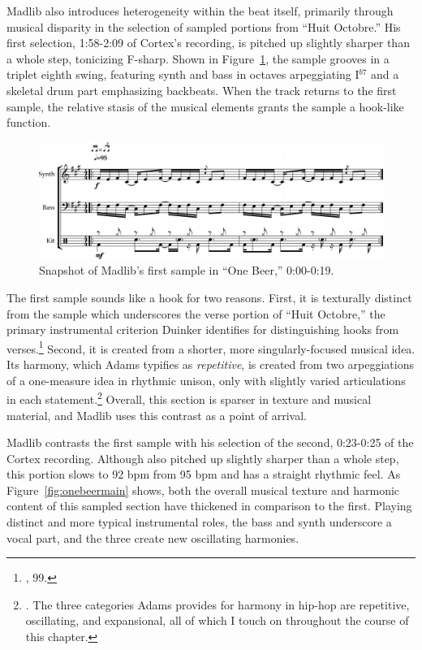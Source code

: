 Madlib also introduces heterogeneity within the beat itself, primarily through musical disparity in the selection of sampled portions from ``Huit Octobre.'' His first selection, 1:58-2:09 of Cortex's recording, is pitched up slightly sharper than a whole step, tonicizing F-sharp. Shown in Figure~\ref{fig:onebeerintro}, the sample grooves in a triplet eighth swing, featuring synth and bass in octaves arpeggiating I$^{b7}$ and a skeletal drum part emphasizing backbeats. When the track returns to the first sample, the relative stasis of the musical elements grants the sample a hook-like function.

    \begin{figure}[ht]
        \centering
        \includegraphics[width=\textwidth]{images/figures/chp 02/000019onebeerintro.pdf}
        \caption{Snapshot of Madlib's first sample in ``One Beer,'' 0:00-0:19.}
        \label{fig:onebeerintro}
    \end{figure}

The first sample sounds like a hook for two reasons. First, it is texturally distinct from the sample which underscores the verse portion of ``Huit Octobre,'' the primary instrumental criterion Duinker identifies for distinguishing hooks from verses.\footnote{\cite{benduinkerSongFormMainstreaming2020}, 99.} Second, it is created from a shorter, more singularly-focused musical idea. Its harmony, which Adams typifies as \emph{repetitive}, is created from two arpeggiations of a one-measure idea in rhythmic unison, only with slightly varied articulations in each statement.\footnote{\cite{kyleadamsHarmonicSyntacticMotivic2020}. The three categories Adams provides for harmony in hip-hop are repetitive, oscillating, and expansional, all of which I touch on throughout the course of this chapter.} Overall, this section is sparser in texture and musical material, and Madlib uses this contrast as a point of arrival.

Madlib contrasts the first sample with his selection of the second, 0:23-0:25 of the Cortex recording. Although also pitched up slightly sharper than a whole step, this portion slows to 92 bpm from 95 bpm and has a straight rhythmic feel. As Figure~\ref{fig:onebeermain} shows, both the overall musical texture and harmonic content of this sampled section have thickened in comparison to the first. Playing distinct and more typical instrumental roles, the bass and synth underscore a vocal part, and the three create new oscillating harmonies.

